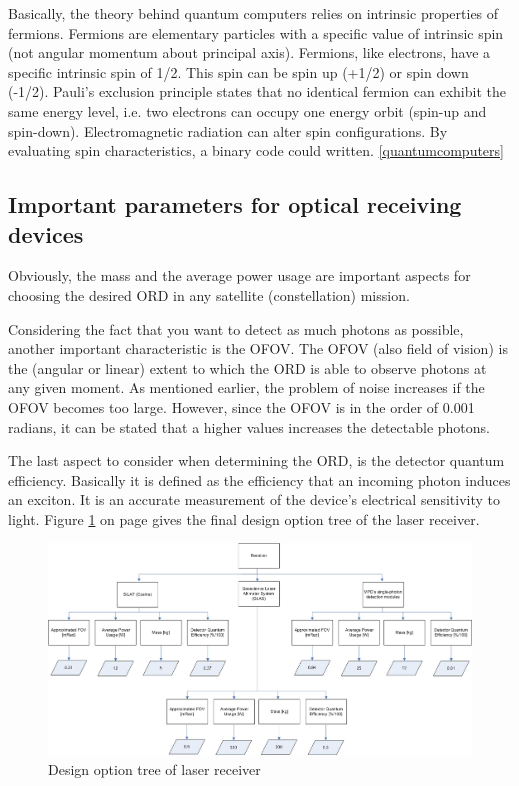 \begin{enumerate}[i]
Basically, the theory behind quantum computers relies on intrinsic properties of fermions. Fermions are elementary particles with a specific value of intrinsic spin (not angular momentum about principal axis). Fermions, like electrons, have a specific intrinsic spin of 1/2. This spin can be spin up (+1/2) or spin down (-1/2). Pauli's exclusion principle states that no identical fermion can exhibit the same energy level, i.e. two electrons can occupy one energy orbit (spin-up and spin-down). Electromagnetic radiation can alter spin configurations. By evaluating spin characteristics, a binary code could written.
\ref{quantumcomputers}
	
\end{enumerate}

\subsection{Important parameters for optical receiving devices}
	\label{blDOparametersORD}
Obviously, the mass and the average power usage are important aspects for choosing the desired \acs{ORD} in any satellite (constellation) mission. 

Considering the fact that you want to detect as much photons as possible, another important characteristic is the \ac{OFOV}. The \acs{OFOV} (also field of vision) is the (angular or linear) extent to which the \acs{ORD} is able to observe photons at any given moment. As mentioned earlier, the problem of noise increases if the \acs{OFOV} becomes too large. However, since the \acs{OFOV} is in the order of 0.001 radians, it can be stated that a higher values increases the detectable photons.

The last aspect to consider when determining the \acs{ORD}, is the detector quantum efficiency. Basically it is defined as the efficiency that an incoming photon induces an exciton. It is an accurate measurement of the device's electrical sensitivity to light. 
Figure \ref{DOS_receiver} on page \pageref{DOS_receiver} gives the final design option tree of the laser receiver.
\begin{figure} [h]
	\begin{center} \includegraphics[width=1\textwidth,angle=90]{chapters/img/DOStree_receiver.jpg}	
	\caption{Design option tree of laser receiver}
	\label{DOS_receiver}
	\end{center}
\end{figure}